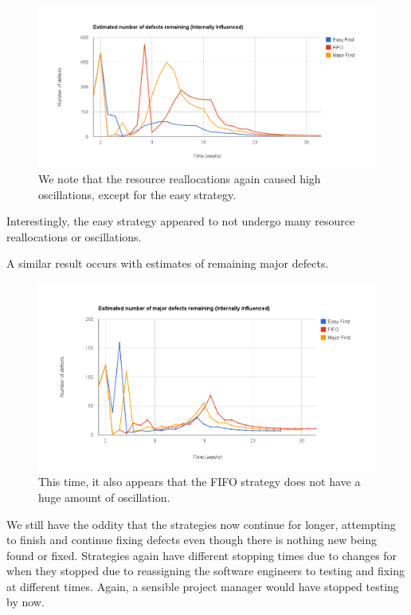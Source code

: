 \begin{figure}[ht!]
	\centering
	\includegraphics[scale=0.45]{graphs/EstRemDefs_in.png}
	\caption{We note that the resource reallocations again caused high oscillations, except for the
easy strategy.} 
	\label{in_estremdefs}
\end{figure}

Interestingly, the easy strategy appeared to not undergo many resource reallocations or
oscillations.

\pagebreak

A similar result occurs with estimates of remaining major defects.

\begin{figure}[ht!]
	\centering
	\includegraphics[scale=0.45]{graphs/EstRemMajDef_in.png}
	\caption{This time, it also appears that the FIFO strategy does not have a huge amount of
oscillation.} 
	\label{in_estremmajdef}
\end{figure}

We still have the oddity that the strategies now continue for longer, attempting to finish and
continue fixing defects even though there is nothing new being found or fixed.
Strategies again have different stopping times due to changes for when they stopped due to reassigning the software engineers to testing and fixing
at different times.
Again, a sensible project manager would have stopped testing by now.

